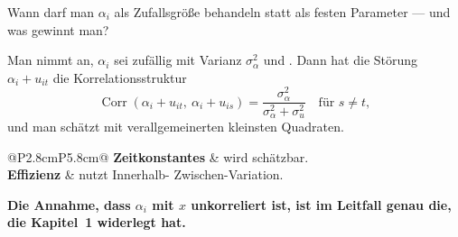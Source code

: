 \begin{aufgabe}
Wann darf man $\alpha_i$ als Zufallsgröße behandeln statt als festen Parameter --- und was gewinnt man?

\loesung
{}
Man nimmt an, $\alpha_i$ sei zufällig mit Varianz $\sigma_\alpha^{2}$ und . Dann hat die Störung $\alpha_i + u_{it}$ die Korrelationsstruktur
\[ \operatorname{Corr}(\alpha_i+u_{it},\ \alpha_i+u_{is}) = \frac{\sigma_\alpha^{2}}{\sigma_\alpha^{2}+\sigma_u^{2}} \quad\text{für } s\ne t , \]
und man schätzt mit verallgemeinerten kleinsten Quadraten.

\begin{center}
{\small
\renewcommand{\arraystretch}{1.5}
\begin{tabular}{@{}P{2.8cm}P{5.8cm}@{}}
\toprule
\textbf{Zeitkonstantes} & wird schätzbar.\\
\textbf{Effizienz} & nutzt Innerhalb-  Zwischen-Variation.\\
\bottomrule
\end{tabular}}
\end{center}

\begin{center}
\begin{minipage}{0.9\textwidth}
\textbf{Die Annahme, dass $\alpha_i$ mit $x$ unkorreliert ist, ist im Leitfall genau die, die Kapitel~1 widerlegt hat.}
\end{minipage}
\end{center}

\begin{center}
\begin{minipage}{0.88\textwidth}
\end{minipage}
\end{center}
\end{aufgabe}

